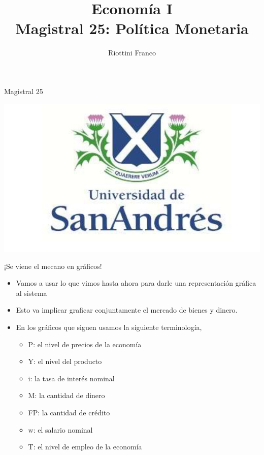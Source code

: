 \documentclass{beamer}
\title[Economía I]{Economía I \vspace{4mm}
\\ Magistral 25: Política Monetaria}
\date{}
\author[Riottini]{Riottini Franco}
\institute[]{Universidad de San Andrés}
\begin{document}
\begin{frame}
\titlepage
\centering
Magistral 25

\includegraphics[scale=0.2]{../Figures/logoUDESA.jpg} 
\end{frame}


\begin{frame}{¡Se viene el mecano en gráficos!}

\begin{itemize}
    \item Vamos a usar lo que vimos hasta ahora para darle una representación gráfica al sistema 
    \item Esto va implicar graficar conjuntamente el mercado de bienes y dinero.
    \item En los gráficos que siguen usamos la siguiente terminología, 
    \begin{itemize}
        \item P: el nivel de precios de la economía
        \item Y: el nivel del producto
        \item i: la tasa de interés nominal
        \item M: la cantidad de dinero
        \item FP: la cantidad de crédito
        \item w: el salario nominal
        \item T: el nivel de empleo de la economía
    \end{itemize}
\end{itemize}

\end{frame}
\end{document}
